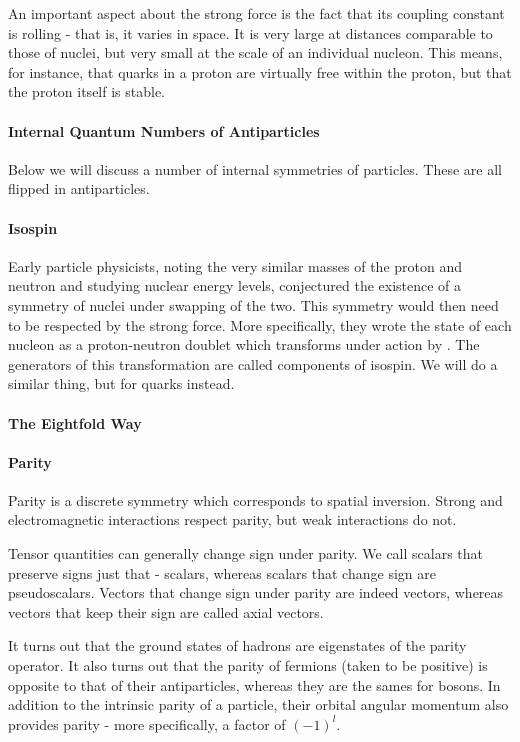 An important aspect about the strong force is the fact that its coupling constant is rolling - that is, it varies in space. It is very large at distances comparable to those of nuclei, but very small at the scale of an individual nucleon. This means, for instance, that quarks in a proton are virtually free within the proton, but that the proton itself is stable.

\paragraph{Internal Quantum Numbers of Antiparticles}
Below we will discuss a number of internal symmetries of particles. These are all flipped in antiparticles.

\paragraph{Isospin}
Early particle physicists, noting the very similar masses of the proton and neutron and studying nuclear energy levels, conjectured the existence of a symmetry of nuclei under swapping of the two. This symmetry would then need to be respected by the strong force. More specifically, they wrote the state of each nucleon as a proton-neutron doublet which transforms under action by . The generators of this transformation are called components of isospin. We will do a similar thing, but for quarks instead.

\paragraph{The Eightfold Way}

\paragraph{Parity}
Parity is a discrete symmetry which corresponds to spatial inversion. Strong and electromagnetic interactions respect parity, but weak interactions do not.

Tensor quantities can generally change sign under parity. We call scalars that preserve signs just that - scalars, whereas scalars that change sign are pseudoscalars. Vectors that change sign under parity are indeed vectors, whereas vectors that keep their sign are called axial vectors.

It turns out that the ground states of hadrons are eigenstates of the parity operator. It also turns out that the parity of fermions (taken to be positive) is opposite to that of their antiparticles, whereas they are the sames for bosons. In addition to the intrinsic parity of a particle, their orbital angular momentum also provides parity - more specifically, a factor of $(-1)^{l}$.


